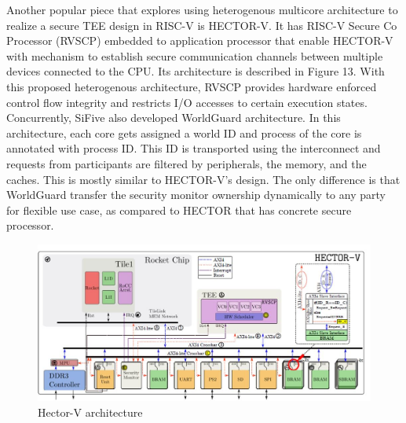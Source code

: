 \documentclass[review]{elsarticle}
\begin{document}
Another popular piece that explores using heterogenous multicore architecture to realize a secure TEE design in RISC-V is HECTOR-V. It has RISC-V Secure Co Processor (RVSCP) embedded to application processor that enable HECTOR-V with mechanism to establish secure communication channels between multiple devices connected to the CPU. Its architecture is described in Figure 13. With this proposed heterogenous architecture, RVSCP provides hardware enforced control flow integrity and restricts I/O accesses to certain execution states. Concurrently, SiFive also developed WorldGuard architecture. In this architecture, each core gets assigned a world ID and process of the core is annotated with process ID. This ID is transported using the interconnect and requests from participants are filtered by peripherals, the memory, and the caches. This is mostly similar to HECTOR-V’s design. The only difference is that WorldGuard transfer the security monitor ownership dynamically to any party for flexible use case, as compared to HECTOR that has concrete secure processor.

\begin{figure}[H]
	\centering
	\includegraphics[width=1\textwidth]{figs/Hector.JPG}
	\caption{Hector-V architecture}
\end{figure}
\end{document}

